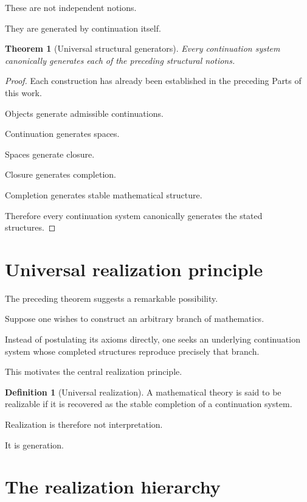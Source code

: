 \documentclass[13pt,openany]{book}
\theoremstyle{plain}
\newtheorem{theorem}{Theorem}[chapter]
\theoremstyle{definition}
\newtheorem{definition}{Definition}[chapter]
\begin{document}
These are not independent notions.

They are generated by continuation itself.

\begin{theorem}[Universal structural generators]
Every continuation system canonically generates each of the preceding
structural notions.
\end{theorem}

\begin{proof}
Each construction has already been established in the preceding Parts of
this work.

Objects generate admissible continuations.

Continuation generates spaces.

Spaces generate closure.

Closure generates completion.

Completion generates stable mathematical structure.

Therefore every continuation system canonically generates the stated
structures.
\end{proof}


\section{Universal realization principle}

The preceding theorem suggests a remarkable possibility.

Suppose one wishes to construct an arbitrary branch of mathematics.

Instead of postulating its axioms directly, one seeks an underlying
continuation system whose completed structures reproduce precisely that
branch.

This motivates the central realization principle.

\begin{definition}[Universal realization]
A mathematical theory is said to be realizable if it is recovered as the
stable completion of a continuation system.
\end{definition}

Realization is therefore not interpretation.

It is generation.


\section{The realization hierarchy}
\end{document}
